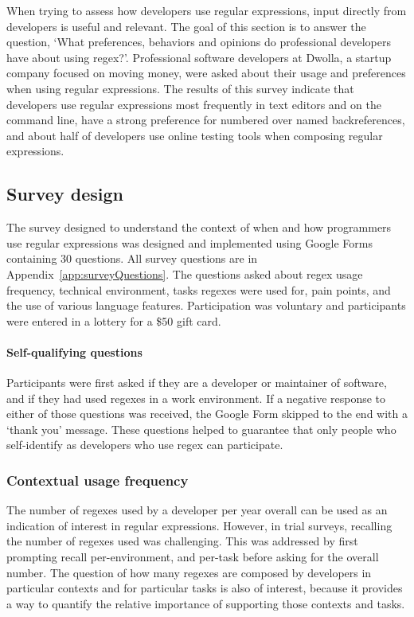 When trying to assess how developers use regular expressions, input directly from developers is useful and relevant.  The goal of this section is to answer the question, `What preferences, behaviors and opinions do professional developers have about using regex?'.  Professional software developers at Dwolla, a startup company focused on moving money, were asked about their usage and preferences when using regular expressions.  The results of this survey indicate that developers use regular expressions most frequently in text editors and on the command line, have a strong preference for numbered over named backreferences, and about half of developers use online testing tools when composing regular expressions.


\subsection{Survey design}

The survey designed to understand the context of when and how programmers use regular expressions was designed and implemented using Google Forms containing 30 questions.  All survey questions are in Appendix~\ref{app:surveyQuestions}. The questions asked about regex usage frequency, technical environment, tasks regexes were used for, pain points, and the use of various language
features. Participation was voluntary and participants were entered in a lottery for a \$50 gift card.

\paragraph{Self-qualifying questions} Participants were first asked if they are a developer or maintainer of software, and if they had used regexes in a work environment.  If a negative response to either of those questions was received, the Google Form skipped to the end with a `thank you' message.  These questions helped to guarantee that only people who self-identify as developers who use regex can participate.

\subsubsection{Contextual usage frequency}
The number of regexes used by a developer per year overall can be used as an indication of interest in regular expressions.  However, in trial surveys, recalling the number of regexes used was challenging.  This was addressed by first prompting recall per-environment, and per-task before asking for the overall number.  The question of how many regexes are composed by developers in particular contexts and for particular tasks is also of interest, because it provides a way to quantify the relative importance of supporting those contexts and tasks.

